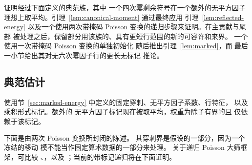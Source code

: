 证明经过下面定义的典范族，其中
一个四次幂剩余符号在一个额外的无平方因子
理想上取平均。引理~\ref{lem:canonical-moment} 通过最终应用
引理~\ref{lem:reflected-energy} 以及一个使用两次带掩码
Poisson 变换的递归步骤来证明。在主贡献与尾部
被处理之后，保留部分用该族的、具有更短行范围的新的可容许和来界。
一个使用一次带掩码 Poisson 变换的单独初始化
随后推出引理~\ref{lem:marked}，而
最后一小节给出其对无六次幂因子行的更长无标记
推论。

\subsection{典范估计}

使用节~\ref{sec:marked-energy} 中定义的固定穿刺、无平方因子系数、行特征，
以及乘积形式标记。额外的
无平方因子标记现在被取平均，权重为除子有界的且
仅依赖于该标记。

下面是由两次 Poisson 变换所封闭的陈述。
其穿刺界是假设的一部分，因为一个冻结的移动
模不能当作固定算术数据的一部分来处理。
关于递归 Poisson 大筛框架，可比较
\cite[节~2]{HBQuadratic}、\cite[节~4]{HB}，以及
\cite[节~4--7]{GL}；当前的带标记递归将在下面证明。

